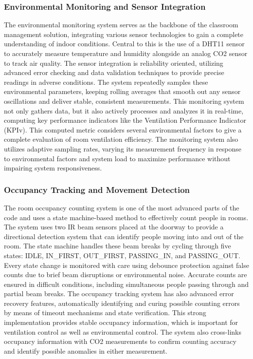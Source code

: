 \subsubsection{Environmental Monitoring and Sensor Integration}
The environmental monitoring system serves as the backbone of the classroom management solution, integrating various sensor technologies to gain a complete understanding of indoor conditions. Central to this is the use of a DHT11 sensor to accurately measure temperature and humidity alongside an analog CO2 sensor to track air quality. The sensor integration is reliability oriented, utilizing advanced error checking and data validation techniques to provide precise readings in adverse conditions. The system repeatedly samples these environmental parameters, keeping rolling averages that smooth out any sensor oscillations and deliver stable, consistent measurements. This monitoring system not only gathers data, but it also actively processes and analyzes it in real-time, computing key performance indicators like the Ventilation Performance Indicator (KPIv). This computed metric considers several environmental factors to give a complete evaluation of room ventilation efficiency. The monitoring system also utilizes adaptive sampling rates, varying its measurement frequency in response to environmental factors and system load to maximize performance without impairing system responsiveness.

\subsubsection{Occupancy Tracking and Movement Detection}
The room occupancy counting system is one of the most advanced parts of the code and uses a state machine-based method to effectively count people in rooms. The system uses two IR beam sensors placed at the doorway to provide a directional detection system that can identify people moving into and out of the room. The state machine handles these beam breaks by cycling through five states: IDLE, IN\_FIRST, OUT\_FIRST, PASSING\_IN, and PASSING\_OUT. Every state change is monitored with care using debounce protection against false counts due to brief beam disruptions or environmental noise. Accurate counts are ensured in difficult conditions, including simultaneous people passing through and partial beam breaks. The occupancy tracking system has also advanced error recovery features, automatically identifying and curing possible counting errors by means of timeout mechanisms and state verification. This strong implementation provides stable occupancy information, which is important for ventilation control as well as environmental control. The system also cross-links occupancy information with CO2 measurements to confirm counting accuracy and identify possible anomalies in either measurement.


